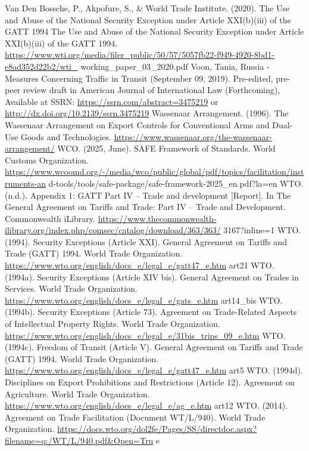 \begin{referencelist}
   Van Den Bossche, P., Akpofure, S., \& World Trade Institute. (2020). The Use and Abuse of the National Security Exception under Article XXI(b)(iii) of the GATT 1994 The Use and Abuse of the National Security Exception under Article XXI(b)(iii) of the GATT 1994. \url{https://www.wti.org/media/filer_public/50/57/5057fb22-f949-4920-8bd1-e8ad352d22b2/wti_} working\_paper\_03\_2020.pdf Voon, Tania, Russia - Measures Concerning Traffic in Transit (September 09, 2019). Pre-edited, pre-peer review draft in American Journal of International Law (Forthcoming), Available at SSRN: \url{https://ssrn.com/abstract=3475219} or \url{http://dx.doi.org/10.2139/ssrn.3475219}
   Wassenaar Arrangement. (1996). The Wassenaar Arrangement on Export Controls for Conventional Arms and Dual-Use Goods and Technologies. \url{https://www.wassenaar.org/the-wassenaar-arrangement/}
   WCO. (2025, June). SAFE Framework of Standards. World Customs Organization. \url{https://www.wcoomd.org/-/media/wco/public/global/pdf/topics/facilitation/instruments-an} d-tools/tools/safe-package/safe-framework-2025\_en.pdf?la=en
   WTO. (n.d.). Appendix 1: GATT Part IV – Trade and development [Report]. In The General Agreement on Tariffs and Trade: Part IV – Trade and Development. Commonwealth iLibrary. \url{https://www.thecommonwealth-ilibrary.org/index.php/comsec/catalog/download/363/363/} 3167?inline=1
   WTO. (1994). Security Exceptions (Article XXI). General Agreement on Tariffs and Trade (GATT) 1994. World Trade Organization. \url{https://www.wto.org/english/docs_e/legal_e/gatt47_e.htm} art21
   WTO. (1994a). Security Exceptions (Article XIV bis). General Agreement on Trades in Services. World Trade Organization. \url{https://www.wto.org/english/docs_e/legal_e/gats_e.htm} art14\_bis
   WTO. (1994b). Security Exceptions (Article 73). Agreement on Trade-Related Aspects of Intellectual Property Rights. World Trade Organization. \url{https://www.wto.org/english/docs_e/legal_e/31bis_trips_09_e.htm}
   WTO. (1994c). Freedom of Transit (Article V). General Agreement on Tariffs and Trade (GATT) 1994. World Trade Organization. \url{https://www.wto.org/english/docs_e/legal_e/gatt47_e.htm} art5
   WTO. (1994d). Disciplines on Export Prohibitions and Restrictions (Article 12). Agreement on Agriculture. World Trade Organization. \url{https://www.wto.org/english/docs_e/legal_e/ag_e.htm} art12
   WTO. (2014). Agreement on Trade Facilitation (Document WT/L/940). World Trade Organization. \url{https://docs.wto.org/dol2fe/Pages/SS/directdoc.aspx?filename=q:/WT/L/940.pdf&Open=Tru} e

\end{referencelist}

